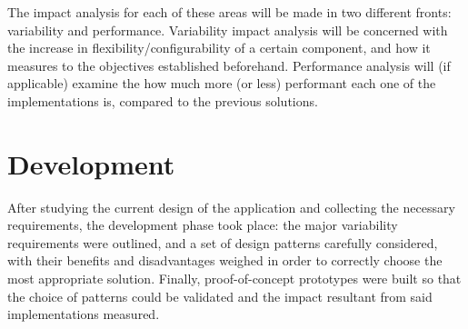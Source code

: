 The impact analysis for each of these areas will be made in two different fronts: variability and performance. Variability impact analysis will be concerned with the increase in flexibility/configurability of a certain component, and how it measures to the objectives established beforehand. Performance analysis will (if applicable) examine the how much more (or less) performant each one of the implementations is, compared to the previous solutions.

\section{Development}\label{sec:development}

After studying the current design of the application and collecting the necessary requirements, the development phase took place: the major variability requirements were outlined, and a set of design patterns carefully considered, with their benefits and disadvantages weighed in order to correctly choose the most appropriate solution. Finally, proof-of-concept prototypes were built so that the choice of patterns could be validated and the impact resultant from said implementations measured.




